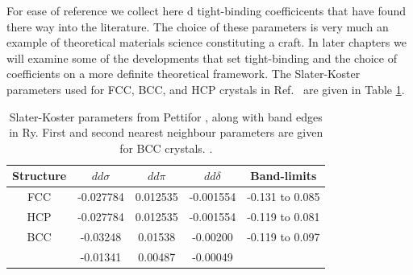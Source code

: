 For ease of reference we collect here d tight-binding coefficicents
that have found there way into the literature. The choice of these parameters
is very much an example of theoretical materials science constituting a 
craft. In later chapters we will examine some of the developments that set
tight-binding and the choice of coefficients on a more definite 
theoretical framework. The Slater-Koster parameters used for FCC, BCC, 
and HCP crystals in Ref.~\cite{haydock72} are given in Table \ref{tab:pettiparams}.
%
\begin{table}
\begin{center}
\begin{tabular}{|c|c|c|c|c|} 
\hline
Structure & $dd\sigma$ & $dd\pi$  & $dd\delta$ &  Band-limits \\
\hline
FCC       & -0.027784  & 0.012535 & -0.001554  & -0.131 to 0.085 \\ 
\hline
HCP       & -0.027784  & 0.012535 & -0.001554  & -0.119 to 0.081 \\
\hline
BCC       & -0.03248   & 0.01538  & -0.00200   & -0.119 to 0.097 \\
          & -0.01341   & 0.00487  & -0.00049   &              \\
\hline
\end{tabular}
\caption{Slater-Koster parameters from Pettifor \cite{pettifor69}, 
along with band edges in Ry. First and second nearest neighbour 
parameters are given for BCC crystals. \label{tab:pettiparams}.}
\end{center}
\end{table}
%
%

